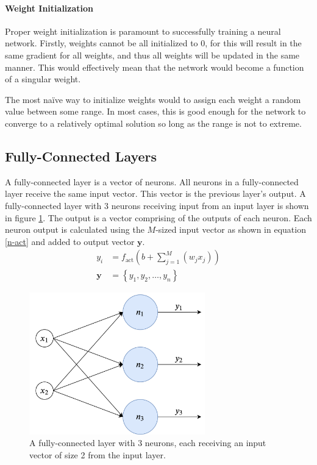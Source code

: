 \paragraph{Weight Initialization}
Proper weight initialization is paramount to successfully training a neural network. Firstly, weights cannot be all initialized to 0, for this will result in the same gradient for all weights, and thus all weights will be updated in the same manner. This would effectively mean that the network would become a function of a singular weight.

The most na\"ive way to initialize weights would to assign each weight a random value between some range. In most cases, this is good enough for the network to converge to a relatively optimal solution so long as the range is not to extreme. 


\subsection{Fully-Connected Layers}
A fully-connected layer is a vector of neurons. All neurons in a fully-connected layer receive the same input vector. This vector is the previous layer's output. A fully-connected layer with 3 neurons receiving input from an input layer is shown in figure \ref{fully-connected}. The output is a vector comprising of the outputs of each neuron. Each neuron output is calculated using the $M$-sized input vector as shown in equation \ref{n-act} and added to output vector $\mathbf{y}$.
\begin{align}
y_i &= f_{\text{act}}\left( b + \sum_{j=1}^{M}(w_jx_j) \right) \label{n-act} \\
\mathbf{y} &= \left\{ y_1, y_2, \ldots, y_n \right\} 
\end{align}

\begin{figure}
	\centering
	\includegraphics[width=3in]{figures/fully-connected}
	\caption{A fully-connected layer with 3 neurons, each receiving an input vector of size 2 from the input layer.}\label{fully-connected}
\end{figure}

